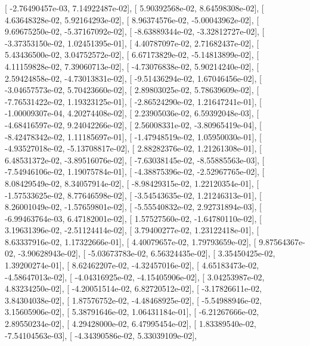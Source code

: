 \documentclass{article}
\begin{document}
       [ -2.76490457e-03,   7.14922487e-02],
       [  5.90392568e-02,   8.64598308e-02],
       [  4.63648328e-02,   5.92164293e-02],
       [  8.96374576e-02,  -5.00043962e-02],
       [  9.69675250e-02,  -5.37167092e-02],
       [ -8.63889344e-02,  -3.32812727e-02],
       [ -3.37353150e-02,   1.02451395e-01],
       [  4.40787097e-02,   2.71682437e-02],
       [  5.43436500e-02,   3.04752572e-02],
       [  6.67173829e-02,  -5.14813899e-02],
       [  4.11159828e-02,   7.39060713e-02],
       [ -4.73076838e-02,   5.90214240e-02],
       [  2.59424858e-02,  -4.73013831e-02],
       [ -9.51436294e-02,   1.67046456e-02],
       [ -3.04657573e-02,   5.70423660e-02],
       [  2.89803025e-02,   5.78639609e-02],
       [ -7.76531422e-02,   1.19323125e-01],
       [ -2.86524290e-02,   1.21647241e-01],
       [ -1.00009307e-04,   4.20274408e-02],
       [  2.23905036e-02,   6.59392048e-03],
       [ -4.68416597e-02,   9.24042266e-02],
       [  2.56008331e-02,  -3.80965419e-04],
       [ -8.42478342e-02,   1.11185697e-01],
       [ -1.47948519e-02,   1.05950030e-01],
       [ -4.93527018e-02,  -5.13708817e-02],
       [  2.88282376e-02,   1.21261308e-01],
       [  6.48531372e-02,  -3.89516076e-02],
       [ -7.63038145e-02,  -8.55885563e-03],
       [ -7.54946106e-02,   1.19075784e-01],
       [ -4.38875396e-02,  -2.52967765e-02],
       [  8.08429549e-02,   8.34057914e-02],
       [ -8.98429315e-02,   1.22120354e-01],
       [ -1.57533625e-02,   8.77646598e-02],
       [ -3.54543635e-02,   1.21246313e-01],
       [  8.26001049e-02,  -1.57659801e-02],
       [ -5.55540832e-02,   2.92731894e-03],
       [ -6.99463764e-03,   6.47182001e-02],
       [  1.57527560e-02,  -1.64780110e-02],
       [  3.19631396e-02,  -2.51124414e-02],
       [  3.79400277e-02,   1.23122418e-01],
       [  8.63337916e-02,   1.17322666e-01],
       [  4.40079657e-02,   1.79793659e-02],
       [  9.87564367e-02,  -3.90628943e-02],
       [ -5.03673783e-02,   6.56324435e-02],
       [  3.35450425e-02,   1.39200274e-01],
       [  8.62462207e-02,  -4.32457016e-02],
       [  4.65183473e-02,  -4.58647013e-02],
       [ -4.04316925e-02,  -4.15405906e-02],
       [  3.04253987e-02,   4.83234250e-02],
       [ -4.20051514e-02,   6.82720512e-02],
       [ -3.17826611e-02,   3.84304038e-02],
       [  1.87576752e-02,  -4.48468925e-02],
       [ -5.54988946e-02,   3.15605906e-02],
       [  5.38791646e-02,   1.06431184e-01],
       [ -6.21267666e-02,   2.89550234e-02],
       [  4.29428000e-02,   6.47995454e-02],
       [  1.83389540e-02,  -7.54104563e-03],
       [ -4.34390586e-02,   5.33039109e-02],
\end{document}
